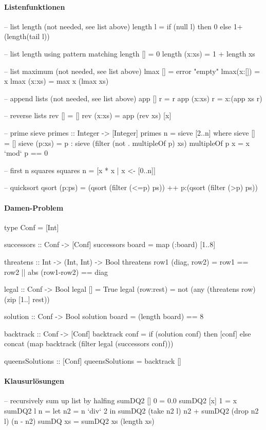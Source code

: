 \paragraph{Listenfunktionen}
\begin{haskell}
  -- list length (not needed, see list above)
  length l = if (null l) then 0 else 1+(length(tail l))

  -- list length using pattern matching
  length [] = 0
  length (x:xs) = 1 + length xs

  -- list maximum (not needed, see list above)
  lmax [] = error "empty"
  lmax(x:[]) = x
  lmax (x:xs) = max x (lmax xs)

  -- append lists (not needed, see list above)
  app [] r = r
  app (x:xs) r = x:(app xs r)

  -- reverse lists
  rev [] = []
  rev (x:xs) = app (rev xs) [x]

  -- prime sieve
  primes :: Integer -> [Integer]
  primes n = sieve [2..n]
    where sieve [] = []
          sieve (p:xs) = p : sieve (filter (not . multipleOf p) xs)
          multipleOf p x = x `mod` p == 0

  -- first n squares
  squares n = [x * x | x <- [0..n]]

  -- quicksort
  qsort (p:ps) =      (qsort (filter (<=p) ps))
                 ++ p:(qsort (filter (>p) ps))
\end{haskell}

\paragraph{Damen-Problem}
\begin{haskell}
  type Conf = [Int]

  successors :: Conf -> [Conf]
  successors board = map (:board) [1..8]
  
  threatens :: Int -> (Int, Int) -> Bool
  threatens row1 (diag, row2) = row1 == row2
    || abs (row1-row2) == diag
  
  legal :: Conf -> Bool
  legal [] = True
  legal (row:rest) = not (any (threatens row) (zip [1..] rest))
  
  solution :: Conf -> Bool
  solution board = (length board) == 8
  
  backtrack :: Conf -> [Conf]
  backtrack conf =
    if (solution conf) then [conf]
    else concat (map backtrack (filter legal (successors conf)))
  
  queensSolutions :: [Conf]
  queensSolutions = backtrack []
\end{haskell}

\paragraph{Klausurlösungen}
\begin{haskell}
  -- recursively sum up list by halfing
  sumDQ2 [] 0 = 0.0
  sumDQ2 [x] 1 = x
  sumDQ2 l n = let n2 = n `div` 2 in
               sumDQ2 (take n2 l) n2 + sumDQ2 (drop n2 l) (n - n2)
  sumDQ xs = sumDQ2 xs (length xs)
\end{haskell}